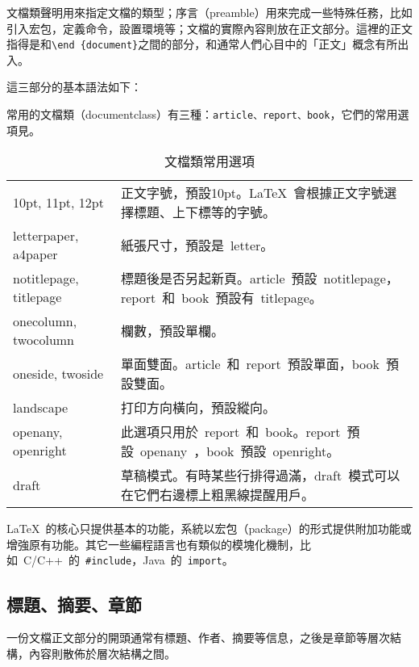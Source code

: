 文檔類聲明用來指定文檔的類型；序言（preamble）用來完成一些特殊任務，比如引入宏包，定義命令，設置環境等；文檔的實際內容則放在正文部分。這裡的正文指得是\verb||和\verb|\end|~\verb|{document}|之間的部分，和通常人們心目中的「正文」概念有所出入。

這三部分的基本語法如下：

常用的文檔類（documentclass）有三種：\verb|article、report、book|，它們的常用選項見。

\begin{table}[htbp]
\centering
\caption{文檔類常用選項}
\label{tab:class_options}
\begin{tabularx}{350pt}{lX}
    \toprule
    10pt, 11pt, 12pt & 正文字號，預設10pt。\LaTeX~會根據正文字號選擇標題、上下標等的字號。\\
    letterpaper, a4paper & 紙張尺寸，預設是~letter。\\
    notitlepage, titlepage & 標題後是否另起新頁。article~預設~notitlepage，report~和~book~預設有~titlepage。\\
    onecolumn, twocolumn & 欄數，預設單欄。\\
    oneside, twoside & 單面雙面。article~和~report~預設單面，book~預設雙面。\\
    landscape & 打印方向橫向，預設縱向。\\
    openany, openright & 此選項只用於~report~和~book。report~預設~openany~，book~預設~openright。\\
    draft & 草稿模式。有時某些行排得過滿，draft~模式可以在它們右邊標上粗黑線提醒用戶。\\
    \bottomrule
\end{tabularx}
\end{table}

\LaTeX~的核心只提供基本的功能，系統以宏包（package）的形式提供附加功能或增強原有功能。其它一些編程語言也有類似的模塊化機制，比如~C/C++~的~\verb|#include|，Java~的~\verb|import|。

\subsection{標題、摘要、章節}


一份文檔正文部分的開頭通常有標題、作者、摘要等信息，之後是章節等層次結構，內容則散佈於層次結構之間。

